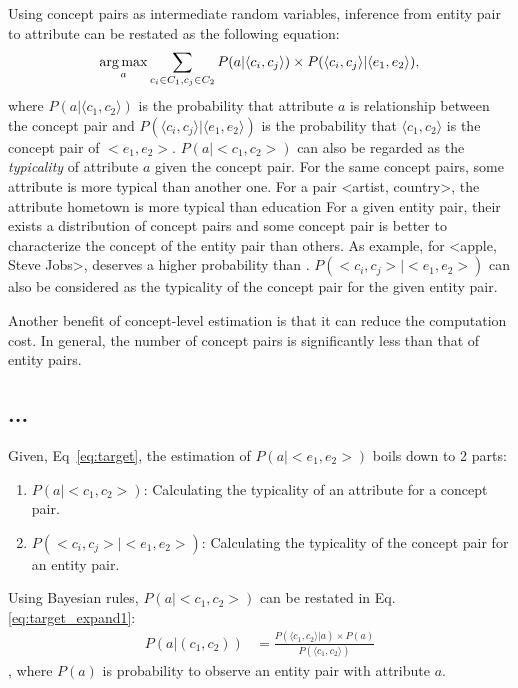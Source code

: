 Using concept pairs as intermediate random variables, inference from entity pair to attribute can be restated as the following equation:
\begin{equation}
\label{eq:target}
\operatorname*{arg\,max}_a \sum_{c_i\in C_1 , c_j \in C_2 }P(a|\langle c_{i},c_{j}\rangle)\times P(\langle c_{i},c_{j}\rangle|\langle e_{1},e_{2}\rangle),
\end{equation}
where $P(a|\langle c_{1},c_{2}\rangle)$ is the probability that attribute $a$ is relationship between the concept pair
and $P(\langle c_{i},c_{j}\rangle |\langle e_{1},e_{2}\rangle)$ is the probability that $\langle c_1, c_2\rangle$ is the concept pair of $<e_1, e_2>$.
$P(a|<c_{1},c_{2}>)$ can also be regarded as the {\it typicality} of attribute $a$ given the concept pair.
For the same concept pairs, some attribute is more typical than another one.
For a pair \ac{<artist, country>}, the attribute \ac{hometown} is more typical than \ac{education}
For a given entity pair, their exists a distribution of concept pairs and some concept pair is better to characterize the concept of the entity pair than others.
As example,  for \ac{<apple, Steve Jobs>},   deserves a higher probability than .
$P(<c_{i},c_{j}>|<e_{1},e_{2}>)$ can also be considered as the typicality of the concept pair for the given entity pair.


Another benefit of concept-level estimation is that it can reduce the computation cost.
In general, the number of concept pairs is significantly less than that of entity pairs.

\subsection{...}
Given, Eq~\ref{eq:target}, the estimation of $P(a|<e_1,e_2>)$ boils down to 2 parts:
\begin{enumerate}
\item $P(a|<c_{1},c_{2}>)$: Calculating the typicality of an attribute for a concept pair.
\item $P(<c_{i},c_{j}>|<e_{1},e_{2}>)$: Calculating the typicality of the concept pair for an entity pair.
\end{enumerate}

Using Bayesian rules, $P(a|<c_{1},c_{2}>)$ can be restated in Eq.\ref{eq:target_expand1}:
\begin{equation}
\label{eq:target_expand1}
\begin{split}
P(a|(c_{1},c_{2})) &= \frac{ P(\langle c_{1},c_{2}\rangle|a)\times P(a) }{ P(\langle c_{1},c_{2}\rangle) }
\end{split}
\end{equation},
where $P(a)$ is probability to observe an entity pair with attribute $a$.


